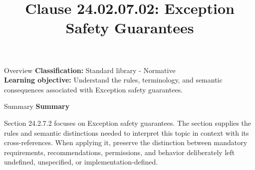 \documentclass[10pt,letterpaper]{article}
\title{Clause 24.02.07.02: Exception Safety Guarantees}
\author{}
\date{}
\begin{document}
\maketitle
\begin{CornellOverviewBox}{Overview}
\textbf{Classification:} Standard library - Normative\\[2pt]
\textbf{Learning objective:} Understand the rules, terminology, and semantic consequences associated with Exception safety guarantees.
\end{CornellOverviewBox}\begin{CornellSummaryBox}{Summary}
{\sffamily\bfseries\color{Accent} Summary}\par\vspace{3pt}Section 24.2.7.2 focuses on Exception safety guarantees. The section supplies the rules and semantic distinctions needed to interpret this topic in context with its cross-references. When applying it, preserve the distinction between mandatory requirements, recommendations, permissions, and behavior deliberately left undefined, unspecified, or implementation-defined.
\end{CornellSummaryBox}
\end{document}
